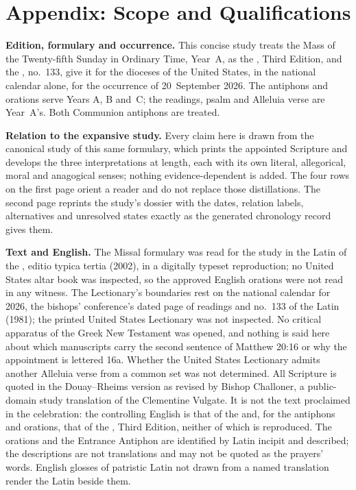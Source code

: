 
\section{Appendix: Scope and Qualifications}

{\footnotesize
\setlength{\parskip}{0pt}
\textbf{Edition, formulary and occurrence.} This concise study treats the Mass
of the Twenty-fifth Sunday in Ordinary Time, Year~A, as the , Third Edition, and the , no.~133, give it
for the dioceses of the United States, in the national calendar alone, for the
occurrence of 20~September 2026. The antiphons and orations serve Years A, B
and~C; the readings, psalm and Alleluia verse are Year~A's. Both
Communion antiphons are treated.

\textbf{Relation to the expansive study.} Every claim here is drawn from the
canonical study of this same formulary, which prints the appointed Scripture
and develops the three interpretations at length, each with its own literal,
allegorical, moral and anagogical senses; nothing evidence-dependent is added.
The four rows on the first page orient a reader and do not replace those
distillations. The second page reprints the study's dossier with the dates,
relation labels, alternatives and unresolved states exactly as the generated
chronology record gives them.

\textbf{Text and English.} The Missal formulary was read for the study in the
Latin of the , editio typica tertia (2002), in a
digitally typeset reproduction; no United States altar book was inspected, so
the approved English orations were not read in any witness. The Lectionary's
boundaries rest on the national calendar for 2026, the bishops' conference's
dated page of readings and no.~133 of the Latin 
(1981); the printed United States Lectionary was not inspected. No critical apparatus of the Greek New
Testament was opened, and nothing is said here about which manuscripts carry
the second sentence of Matthew 20:16 or why the appointment is lettered 16a.
Whether the United States Lectionary admits another Alleluia verse from a
common set was not determined.
All Scripture is quoted in the Douay--Rheims version as revised by Bishop
Challoner, a public-domain study translation of the Clementine Vulgate. It is
not the text proclaimed in the celebration: the controlling English is that of
the  and, for the antiphons and orations, that of the ,
Third Edition, neither of which is reproduced. The orations and the Entrance
Antiphon are identified by Latin incipit and described; the descriptions are
not translations and may not be quoted as the prayers' words. English glosses
of patristic Latin not drawn from a named translation render the Latin beside
them.

}
